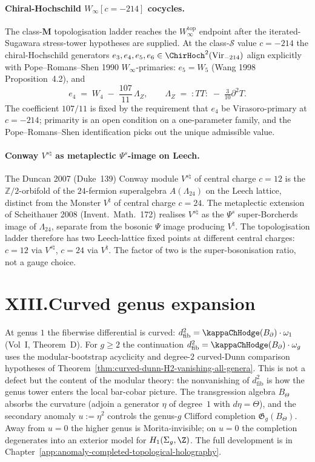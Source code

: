 \paragraph{Chiral-Hochschild $W_\infty[c=-214]$ cocycles.}
The class-$\mathbf{M}$ topologisation ladder reaches the
$W_\infty^{\mathrm{top}}$ endpoint after the iterated-Sugawara
stress-tower hypotheses are supplied. At the
class-$\mathcal{S}$ value $c = -214$ the chiral-Hochschild generators
$e_3, e_4, e_5, e_6 \in \ChirHoch^2(\mathrm{Vir}_{-214})$ align
explicitly with Pope--Romans--Shen 1990 $W_\infty$-primaries:
$e_5 = W_5$ (Wang 1998 Proposition~4.2), and
\[
e_4
\;=\;
W_4 \;-\; \frac{107}{11}\,\Lambda_Z,
\qquad
\Lambda_Z
\;=\;
{:}TT{:}
\;-\;
\tfrac{3}{10}\partial^2 T.
\]
The coefficient $107/11$ is fixed by the requirement that $e_4$ be
Virasoro-primary at $c = -214$; primarity is an open condition on a
one-parameter family, and the Pope--Romans--Shen identification picks
out the unique admissible value.

\paragraph{Conway $V^{s\natural}$ as metaplectic $\Psi^s$-image on Leech.}
The Duncan 2007 (Duke~139) Conway module $V^{s\natural}$ of central
charge $c = 12$ is the $\mathbb Z/2$-orbifold of the $24$-fermion
superalgebra $A(\Lambda_{24})$ on the Leech lattice, distinct from
the Monster $V^\natural$ of central charge $c = 24$. The metaplectic
extension of Scheithauer 2008 (Invent.\ Math.\ 172) realises
$V^{s\natural}$ as the $\Psi^s$ super-Borcherds image of
$\Lambda_{24}$, separate from the bosonic $\Psi$ image producing
$V^\natural$. The topologisation ladder therefore has two
Leech-lattice fixed points at different central charges: $c = 12$ via
$V^{s\natural}$, $c = 24$ via $V^\natural$. The factor of two is the
super-bosonisation ratio, not a gauge choice.

\section*{XIII.\quad Curved genus expansion}

At genus $1$ the fiberwise differential is curved:
$d^2_{\mathrm{fib}} = \kappaChHodge(\Bbound) \cdot \omega_1$ (Vol~I, Theorem~D).
For $g \ge 2$ the continuation
$d^2_{\mathrm{fib}} = \kappaChHodge(\Bbound)\cdot\omega_g$ uses the
modular-bootstrap acyclicity and degree-$2$ curved-Dunn comparison
hypotheses of Theorem~\ref{thm:curved-dunn-H2-vanishing-all-genera}. This
is not a defect but the content of the modular theory: the
nonvanishing of $d^2_{\mathrm{fib}}$ is how the genus tower enters the local
bar-cobar picture. The transgression algebra $B_\Theta$ absorbs
the curvature (adjoin a generator $\eta$ of degree~$1$ with
$d\eta = \Theta$), and the secondary anomaly $u := \eta^2$
controls the genus-$g$ Clifford completion
$\mathfrak{G}_g(B_\Theta)$. Away from $u = 0$ the higher genus
is Morita-invisible; on $u = 0$ the completion degenerates into
an exterior model for $H_1(\Sigma_g, \Z)$. The full development
is in Chapter~\ref{app:anomaly-completed-topological-holography}.

